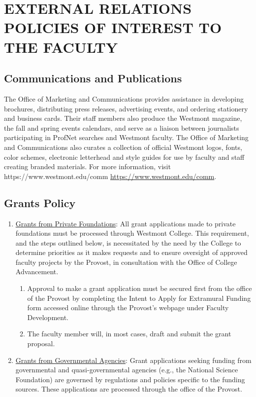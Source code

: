\section{EXTERNAL RELATIONS POLICIES OF INTEREST TO THE FACULTY}
	\subsection{Communications and Publications}
		The Office of Marketing and Communications provides assistance in developing brochures, distributing press releases, advertising events, and ordering stationery and business cards. Their staff members also produce the Westmont magazine, the fall and spring events calendars, and serve as a liaison between journalists participating in ProfNet searches and Westmont faculty.  The Office of Marketing and Communications also curates a collection of official Westmont logos, fonts, color schemes, electronic letterhead and style guides for use by faculty and staff creating branded materials.  For more information, visit https://www.westmont.edu/comm
		\underline{https://www.westmont.edu/comm}.
	\subsection{Grants Policy}
		\begin{enumerate}[label=\alph*)]
			\item{\underline{Grants from Private
					Foundations}:  All grant applications made to private foundations must be processed through Westmont College.  This requirement, and the steps outlined below, is necessitated by the need by the College to determine priorities as it makes requests and to ensure oversight of approved faculty projects by the Provost, in consultation with the Office of College Advancement.
				\begin{enumerate}[label=\alph*)]
					\item{Approval to make a grant application
						must be secured first from
						the office of the Provost by
						completing the Intent to
						Apply for Extramural Funding
						form accessed online through
						the Provost's webpage under
						Faculty Development.}
					\item{The faculty member will, in most
						cases, draft and submit the
						grant proposal.}
				\end{enumerate}
			}
			\item{\underline{Grants from Governmental Agencies}:  Grant applications seeking funding from governmental and quasi-governmental agencies (e.g., the National Science Foundation) are governed by regulations and policies specific to the funding sources. These applications are processed through the office of the Provost.
			}
		\end{enumerate}

